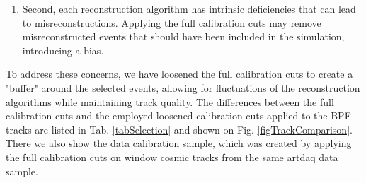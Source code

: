 \documentclass[12pt]{article}
\begin{document}
\begin{enumerate}
\begin{enumerate}
\item Second, each reconstruction algorithm has intrinsic deficiencies that can lead to misreconstructions. Applying the full calibration cuts may remove misreconstructed events that should have been included in the simulation, introducing a bias.
\end{enumerate}

To address these concerns, we have loosened the full calibration cuts to create a "buffer" around the selected events, allowing for fluctuations of the reconstruction algorithms while maintaining track quality. The differences between the full calibration cuts and the employed loosened calibration cuts applied to the BPF tracks are listed in Tab. \ref{tabSelection} and shown on Fig. \ref{figTrackComparison}. There we also show the data calibration sample, which was created by applying the full calibration cuts on window cosmic tracks from the same artdaq data sample.
\end{enumerate}

\end{document}
